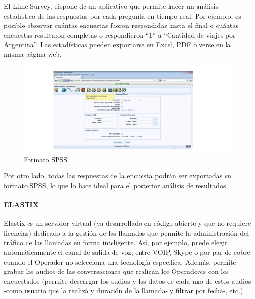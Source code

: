 \documentclass[
  openany]{book}
\begin{document}
El Lime Survey, dispone de un aplicativo que permite hacer un análisis estadístico de las respuestas por cada pregunta en tiempo real. Por ejemplo, es posible observar cuántas encuestas fueron respondidas hasta el final o cuántas encuestas resultaron completas o respondieron ``1'' a ``Cantidad de viajes por Argentina''. Las estadísticas pueden exportarse en Excel, PDF o verse en la misma página web.

\begin{figure}

{\centering \includegraphics[width=1\linewidth]{imagenes/figura6-11} 

}

\caption{Formato SPSS}\label{fig:SPSS}
\end{figure}

Por otro lado, todas las respuestas de la encuesta podrán ser exportadas en formato SPSS, lo que lo hace ideal para el posterior análisis de resultados.

\hypertarget{elastix}{%
\paragraph{\texorpdfstring{\textbf{ELASTIX}}{ELASTIX}}\label{elastix}}

Elastix es un servidor virtual (ya desarrollado en código abierto y que no requiere licencias) dedicado a la gestión de las llamadas que permite la administración del tráfico de las llamadas en forma inteligente. Así, por ejemplo, puede elegir automáticamente el canal de salida de voz, entre VOIP, Skype o por par de cobre cuando el Operador no selecciona una tecnología específica. Además, permite grabar los audios de las conversaciones que realizan los Operadores con los encuestados (permite descargar los audios y los datos de cada uno de estos audios -como usuario que la realizó y duración de la llamada- y filtrar por fecha-, etc.).
\end{document}
